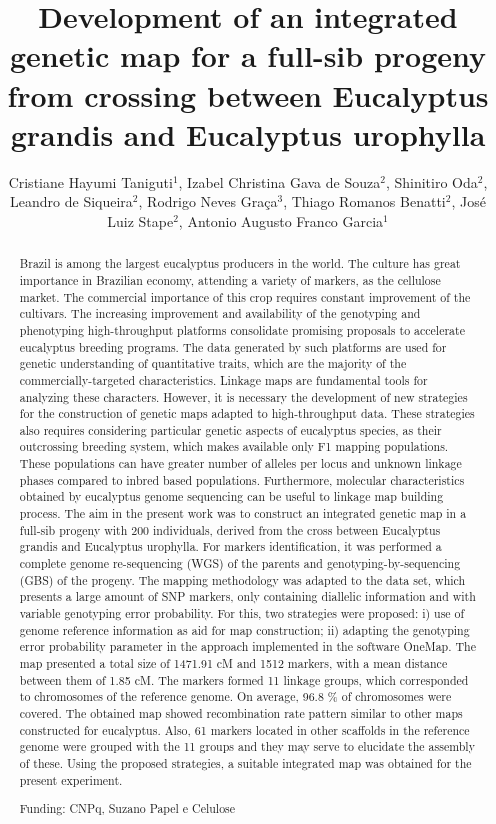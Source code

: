 \documentclass[twoside]{article}
\title{\vspace{-15mm}\fontsize{24pt}{10pt}\selectfont\textbf{Development of an integrated genetic map for a full-sib progeny from crossing between Eucalyptus grandis and Eucalyptus urophylla}} %
\author{Cristiane Hayumi Taniguti$^1$, Izabel Christina Gava de Souza$^2$, Shinitiro Oda$^2$, Leandro de Siqueira$^2$, Rodrigo Neves Gra\c{c}a$^3$, Thiago Romanos Benatti$^2$, Jos\'e Luiz Stape$^2$, Antonio Augusto Franco Garcia$^1$}
\affil{1 USP\\ 2 SUZANO PAPEL E CELULOSE\\ 3 FUTURAGENE\\ }
\date{}
\begin{document}
\maketitle %

\thispagestyle{fancy} %


\begin{abstract}
Brazil is among the largest eucalyptus producers in the world. The culture has great importance in Brazilian economy, attending a variety of markers, as the cellulose market. The commercial importance of this crop requires constant improvement of the cultivars. The increasing improvement and availability of the genotyping and phenotyping high-throughput platforms consolidate promising proposals to accelerate eucalyptus breeding programs. The data generated by such platforms are used for genetic understanding of quantitative traits, which are the majority of the commercially-targeted characteristics. Linkage maps are fundamental tools for analyzing these characters. However, it is necessary the development of new strategies for the construction of genetic maps adapted to high-throughput data. These strategies also requires considering particular genetic aspects of eucalyptus species, as their outcrossing breeding system, which makes available only F1 mapping populations. These populations can have greater number of alleles per locus and unknown linkage phases compared to inbred based populations. Furthermore, molecular characteristics obtained by eucalyptus genome sequencing can be useful to linkage map building process. The aim in the present work was to construct an integrated genetic map in a full-sib progeny with 200 individuals, derived from the cross between Eucalyptus grandis and Eucalyptus urophylla. For markers identification, it was performed a complete genome re-sequencing (WGS) of the parents and genotyping-by-sequencing (GBS) of the progeny. The mapping methodology was adapted to the data set, which presents a large amount of SNP markers, only containing diallelic information and with variable genotyping error probability. For this, two strategies were proposed: i) use of genome reference information as aid for map construction; ii) adapting the genotyping error probability parameter in the approach implemented in the software OneMap. The map presented a total size of 1471.91 cM and 1512 markers, with a mean distance between them of 1.85 cM. The markers formed 11 linkage groups, which corresponded to chromosomes of the reference genome. On average, 96.8 \% of chromosomes were covered. The obtained map showed recombination rate pattern similar to other maps constructed for eucalyptus. Also, 61 markers located in other scaffolds in the reference genome were grouped with the 11 groups and they may serve to elucidate the assembly of these. Using the proposed strategies, a suitable integrated map was obtained for the present experiment.

Funding: CNPq, Suzano Papel e Celulose
\end{abstract}
\end{document}
